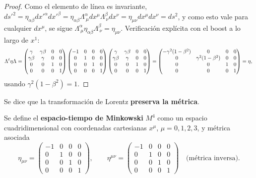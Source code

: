 \begin{proof}
Como el elemento de línea es invariante, $ds'^2=\eta_{\alpha\beta}
dx'^\alpha dx'^\beta = \eta_{\alpha\beta}\Lambda^\alpha_{\ \mu}dx^\mu
\Lambda^\beta_{\ \nu}dx^\nu = \eta_{\mu\nu}dx^\mu dx^\nu = ds^2$, y como
esto vale para cualquier $dx^\mu$, se sigue $\Lambda^\alpha_{\ \mu}
\eta_{\alpha\beta}\Lambda^\beta_{\ \nu}=\eta_{\mu\nu}$. Verificación
explícita con el boost a lo largo de $x^1$:
\[
\Lambda^t\eta\Lambda = \begin{pmatrix}\gamma&\gamma\beta&0&0\\
\gamma\beta&\gamma&0&0\\0&0&1&0\\0&0&0&1\end{pmatrix}
\begin{pmatrix}-1&0&0&0\\0&1&0&0\\0&0&1&0\\0&0&0&1\end{pmatrix}
\begin{pmatrix}\gamma&\gamma\beta&0&0\\\gamma\beta&\gamma&0&0\\
0&0&1&0\\0&0&0&1\end{pmatrix} = \begin{pmatrix}-\gamma^2(1-\beta^2)&0&
0&0\\0&\gamma^2(1-\beta^2)&0&0\\0&0&1&0\\0&0&0&1\end{pmatrix} =
\eta, \qedhere
\]
usando $\gamma^2(1-\beta^2)=1$.
\end{proof}

Se dice que la transformación de Lorentz \textbf{preserva la métrica}.

\begin{definicion}
Se define el \textbf{espacio-tiempo de Minkowski} $M^4$ como un espacio
cuadridimensional con coordenadas cartesianas $x^\mu$, $\mu=0,1,2,3$, y
métrica asociada
\[
\eta_{\mu\nu} = \begin{pmatrix}-1&0&0&0\\0&1&0&0\\0&0&1&0\\0&0&0&1
\end{pmatrix}, \qquad \eta^{\mu\nu} = \begin{pmatrix}-1&0&0&0\\0&1&0&0\\
0&0&1&0\\0&0&0&1\end{pmatrix} \quad\text{(métrica inversa)}.
\]
\end{definicion}


